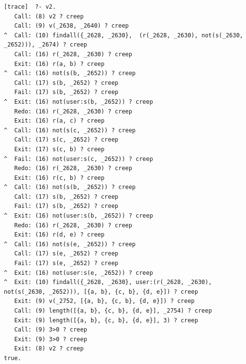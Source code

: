 \documentclass[12pt,fullpage]{article}
\begin{document}
\begin{verbatim}
[trace]  ?- v2.
   Call: (8) v2 ? creep
   Call: (9) v(_2638, _2640) ? creep
^  Call: (10) findall({_2628, _2630},  (r(_2628, _2630), not(s(_2630, _2652))), _2674) ? creep
   Call: (16) r(_2628, _2630) ? creep
   Exit: (16) r(a, b) ? creep
^  Call: (16) not(s(b, _2652)) ? creep
   Call: (17) s(b, _2652) ? creep
   Fail: (17) s(b, _2652) ? creep
^  Exit: (16) not(user:s(b, _2652)) ? creep
   Redo: (16) r(_2628, _2630) ? creep
   Exit: (16) r(a, c) ? creep
^  Call: (16) not(s(c, _2652)) ? creep
   Call: (17) s(c, _2652) ? creep
   Exit: (17) s(c, b) ? creep
^  Fail: (16) not(user:s(c, _2652)) ? creep
   Redo: (16) r(_2628, _2630) ? creep
   Exit: (16) r(c, b) ? creep
^  Call: (16) not(s(b, _2652)) ? creep
   Call: (17) s(b, _2652) ? creep
   Fail: (17) s(b, _2652) ? creep
^  Exit: (16) not(user:s(b, _2652)) ? creep
   Redo: (16) r(_2628, _2630) ? creep
   Exit: (16) r(d, e) ? creep
^  Call: (16) not(s(e, _2652)) ? creep
   Call: (17) s(e, _2652) ? creep
   Fail: (17) s(e, _2652) ? creep
^  Exit: (16) not(user:s(e, _2652)) ? creep
^  Exit: (10) findall({_2628, _2630}, user:(r(_2628, _2630), not(s(_2630, _2652))), [{a, b}, {c, b}, {d, e}]) ? creep
   Exit: (9) v(_2752, [{a, b}, {c, b}, {d, e}]) ? creep
   Call: (9) length([{a, b}, {c, b}, {d, e}], _2754) ? creep
   Exit: (9) length([{a, b}, {c, b}, {d, e}], 3) ? creep
   Call: (9) 3>0 ? creep
   Exit: (9) 3>0 ? creep
   Exit: (8) v2 ? creep
true.
\end{verbatim}
\newpage
{}
\end{document}
